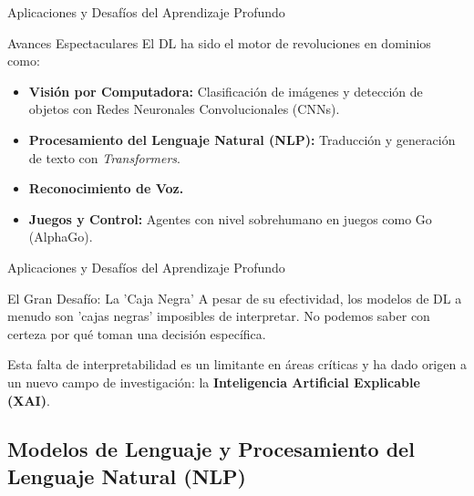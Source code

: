 \documentclass[aspectratio=169,xcolor=dvipsnames]{beamer}
\begin{document}

\begin{frame}{Aplicaciones y Desafíos del Aprendizaje Profundo}

            \begin{block}{Avances Espectaculares}
            El DL ha sido el motor de revoluciones en dominios como:
                \begin{itemize}
                    \item \textbf{Visión por Computadora:} Clasificación de imágenes y detección de objetos con Redes Neuronales Convolucionales (CNNs).
                    \item \textbf{Procesamiento del Lenguaje Natural (NLP):} Traducción y generación de texto con \textit{Transformers}.
                    \item \textbf{Reconocimiento de Voz.}
                    \item \textbf{Juegos y Control:} Agentes con nivel sobrehumano en juegos como Go (AlphaGo).
                \end{itemize}
            \end{block}


           

\end{frame}
\begin{frame}{Aplicaciones y Desafíos del Aprendizaje Profundo}

 \begin{alertblock}{El Gran Desafío: La 'Caja Negra'}
                A pesar de su efectividad, los modelos de DL a menudo son 'cajas negras' imposibles de interpretar. No podemos saber con certeza por qué toman una decisión específica.
                
                \vspace{1em}
                Esta falta de interpretabilidad es un limitante en áreas críticas y ha dado origen a un nuevo campo de investigación: la \textbf{Inteligencia Artificial Explicable (XAI)}.
            \end{alertblock}
\end{frame}
\subsection{Modelos de Lenguaje y Procesamiento del Lenguaje Natural (NLP)}
\end{document}
